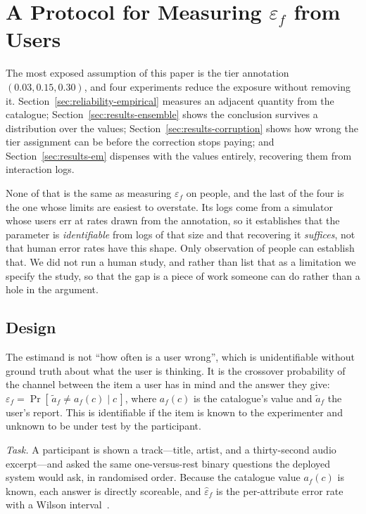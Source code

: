 \appendices

\section{A Protocol for Measuring $\varepsilon_f$ from Users}
\label{app:protocol}

The most exposed assumption of this paper is the tier annotation
$(0.03, 0.15, 0.30)$, and four experiments reduce the exposure without removing
it. Section~\ref{sec:reliability-empirical} measures an adjacent quantity from
the catalogue; Section~\ref{sec:results-ensemble} shows the conclusion survives
a distribution over the values; Section~\ref{sec:results-corruption} shows how
wrong the tier assignment can be before the correction stops paying; and
Section~\ref{sec:results-em} dispenses with the values entirely, recovering
them from interaction logs.

None of that is the same as measuring $\varepsilon_f$ on people, and the last
of the four is the one whose limits are easiest to overstate. Its logs come
from a simulator whose users err at rates drawn from the annotation, so it
establishes that the parameter is \emph{identifiable} from logs of that size
and that recovering it \emph{suffices}, not that human error rates have this
shape. Only observation of people can establish that. We did not run a human
study, and rather than list that as a limitation we specify the study, so that
the gap is a piece of work someone can do rather than a hole in the argument.

\subsection*{Design}

The estimand is not ``how often is a user wrong'', which is unidentifiable
without ground truth about what the user is thinking. It is the crossover
probability of the channel between the item a user has in mind and the answer
they give: $\varepsilon_f = \Pr[\,\tilde{a}_f \neq a_f(c) \mid c\,]$, where
$a_f(c)$ is the catalogue's value and $\tilde{a}_f$ the user's report. This is
identifiable if the item is known to the experimenter and unknown to be under
test by the participant.

\emph{Task.} A participant is shown a track---title, artist, and a
thirty-second audio excerpt---and asked the same one-versus-rest binary
questions the deployed system would ask, in randomised order. Because the
catalogue value $a_f(c)$ is known, each answer is directly scoreable, and
$\hat\varepsilon_f$ is the per-attribute error rate with a Wilson
interval~\cite{wilson1927}.

